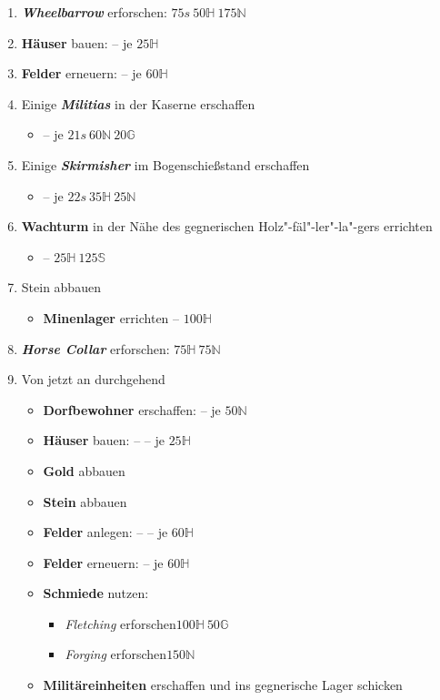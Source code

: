 \documentclass[10pt,twocolumn,a4paper]{article}
\begin{document}
\begin{enumerate}
\item \textbf{\emph{Wheelbarrow}} erforschen: \hfill$75s~50\mathbb H~175\mathbb N$
\item \textbf{Häuser} bauen:  -- \hfill je $25\mathbb H$
\item \textbf{Felder} erneuern:  -- \hfill je $60\mathbb H$
\item Einige \textbf{\emph{Militias}} in der Kaserne erschaffen \begin{itemize}\item {} -- \hfill je $21s~60\mathbb N~20\mathbb G$\end{itemize}
\item Einige \textbf{\emph{Skirmisher}} im Bogenschießstand erschaffen \begin{itemize}\item {} -- \hfill je $22s~35\mathbb H~25\mathbb N$\end{itemize}
\item \textbf{Wachturm} in der Nähe des gegnerischen Holz"-fäl"-ler"-la"-gers errichten
	\begin{itemize}\item {} -- \hfill$25\mathbb H~125\mathbb S$\end{itemize}
\item Stein abbauen \begin{itemize}\item \textbf{Minenlager} errichten  -- \hfill$100\mathbb H$\end{itemize}
\item \textbf{\emph{Horse Collar}} erforschen: \hfill$75\mathbb H~75\mathbb N$
\item Von jetzt an durchgehend \begin{itemize}\item \textbf{Dorfbewohner} erschaffen:  -- \hfill je $50\mathbb N$\item \textbf{Häuser} bauen:  --  -- \hfill je $25\mathbb H$\item \textbf{Gold} abbauen \item \textbf{Stein} abbauen\item \textbf{Felder} anlegen:  --  -- \hfill je $60\mathbb H$\item \textbf{Felder} erneuern:  -- \hfill je $60\mathbb H$\item \textbf{Schmiede} nutzen: \begin{itemize}\item \emph{Fletching} erforschen\hfill$100\mathbb H~50\mathbb G$\item \emph{Forging} erforschen\hfill$150\mathbb N$\end{itemize}\item \textbf{Militäreinheiten} erschaffen und ins gegnerische Lager schicken\end{itemize}

\end{enumerate}
\end{document}
